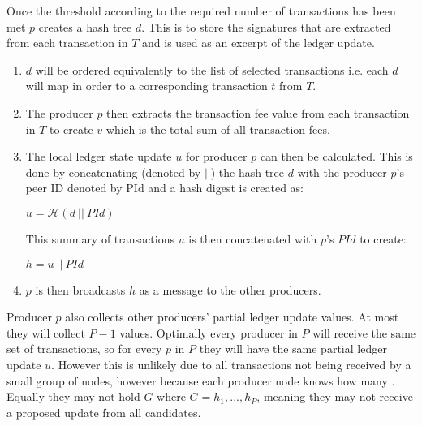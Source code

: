 Once the threshold according to the required number of transactions has been met $p$ creates a hash tree $d$. This is to store the signatures that are extracted from each transaction in $T$ and is used as an excerpt of the ledger update. 

\begin{enumerate}


\item $d$ will be ordered equivalently to the list of selected transactions i.e. each $d$ will map in order to a corresponding transaction $t$ from $T$. 

\item The producer $p$ then extracts the transaction fee value from each transaction in $T$ to create $v$ which is the total sum of all transaction fees.

\item The local ledger state update $u$ for producer $p$ can then be calculated. This is done by concatenating (denoted by $||$) the hash tree $d$ with the producer $p$'s peer ID denoted by PId and a hash digest is created as:

\begin{center}
$u = \mathcal{H}(d~||~PId)$
\end{center}

This summary of transactions $u$ is then concatenated with $p$'s $PId$ to create:

\begin{center}
$h = u ~||~PId$
\end{center}

\item $p$ is then broadcasts $h$ as a message to the other producers.
\end{enumerate}


Producer $p$ also collects other producers' partial ledger update values. At most they will collect $P-1$ values. Optimally every producer in $P$ will receive the same set of transactions, so for every $p$ in $P$ they will have the same partial ledger update $u$. However this is unlikely due to all transactions not being received by a small group of nodes, however because each producer node knows how many . Equally they may not hold $G$ where $G = h_1,...,h_P$, meaning they may not receive a proposed update from all candidates.
